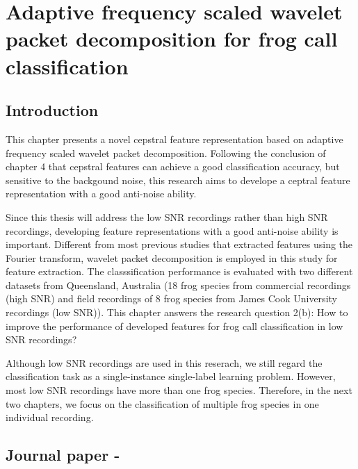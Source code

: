
\chapter[Adaptive frequency scaled wavelet packet decomposition for frog call classification]{Adaptive frequency scaled wavelet packet decomposition for frog call classification}
\label{cha:cha5Wavelet}


\section{Introduction}
This chapter presents a novel cepstral feature representation based on adaptive frequency scaled wavelet packet decomposition. Following the conclusion of chapter 4 that cepstral features can achieve a good classification accuracy, but sensitive to the backgound noise, this research aims to develope a ceptral feature representation with a good anti-noise ability.



Since this thesis will address the low SNR recordings rather than high SNR recordings, developing feature representations with a good anti-noise ability is important. Different from most previous studies that extracted features using the Fourier transform, wavelet packet decomposition is employed in this study for feature extraction. The classsification performance is evaluated with two different datasets from Queensland, Australia (18 frog species from commercial recordings (high SNR) and field recordings of 8 frog species from James Cook University recordings (low SNR)). This chapter answers the research question 2(b): How to improve the performance of developed features for frog call classification in low SNR recordings? 


Although low SNR recordings are used in this reserach, we still regard the classification task as a single-instance single-label learning problem.
However, most low SNR recordings have more than one frog species. Therefore, in the next two chapters, we focus on the classification of multiple frog species in one individual recording.





\section{Journal paper - }





